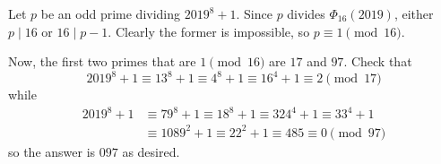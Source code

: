 Let $p$ be an odd prime dividing $2019^8+1$. Since $p$ divides $\Phi_{16}\left(2019\right)$, either $p\mid16$ or $16\mid p-1$. Clearly the former is impossible, so $p\equiv1\pmod{16}$.

Now, the first two primes that are $1\pmod{16}$ are $17$ and $97$. Check that \[2019^8+1\equiv13^8+1\equiv4^8+1\equiv16^4+1\equiv2\pmod{17}\] while
\begin{align*}
	2019^8+1&\equiv79^8+1\equiv18^8+1\equiv324^4+1\equiv33^4+1\\
	&\equiv1089^2+1\equiv22^2+1\equiv485\equiv0\pmod{97}
\end{align*}
so the answer is $\boxed{097}$ as desired.